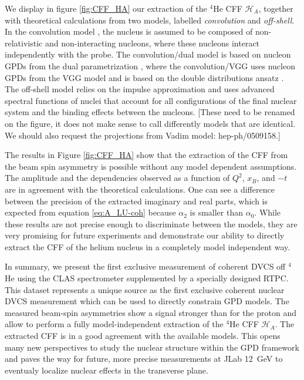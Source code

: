 \documentclass[preprint,nofootinbib,showpacs,prl,superscriptaddress,secnumarabic,amssymb,nobibnotes,aps,floatfix]{revtex4}
\begin{document}
We display in figure \ref{fig:CFF_HA} our extraction of the $^4$He CFF 
$\mathcal{H}_A$, together with theoretical calculations from two models, 
labelled {\em convolution} and {\em off-shell}. In the convolution 
model \cite{Vadim_priv}, the nucleus is assumed to be composed of 
non-relativistic and non-interacting nucleons, where these nucleons interact 
independently with the probe. The convolution/dual model is based on nucleon 
GPDs from the dual parametrization \cite{Guzey:2006xi}, where the 
convolution/VGG uses nucleon GPDs  from the VGG model and is based on the 
double distributions ansatz \cite{DD_model}. The off-shell model 
\cite{GonzalezHernandez:2012jv} relies on the impulse approximation and uses 
advanced spectral functions of  nuclei that account for all configurations of 
the final nuclear system and the binding effects between the nucleons.
[These need to be renamed on the figure, it does not make sense to call differently
models that are identical. We should also request the projections from Vadim
model: hep-ph/0509158.]

The results in Figure \ref{fig:CFF_HA} show that the extraction of the CFF
from the beam spin asymmetry is possible without any model dependent 
assumptions. The amplitude and the dependencies observed as a function of 
$Q^{2}$, $x_B$, and $-t$ are in agreement 
with the theoretical calculations. One can see a difference between the 
precision of the extracted imaginary and real parts, which is expected from
equation \ref{eq:A_LU-coh} because $\alpha_2$ is smaller than $\alpha_0$. 
While these results are not precise enough to discriminate between the models,
they are very promising for future experiments and demonstrate our ability
to directly extract the CFF of the helium nucleus in a completely model
independent way.


In summary, we present the first exclusive measurement of coherent DVCS 
off $^4$He using the CLAS spectrometer supplemented  
by a specially designed RTPC. This dataset represents a 
unique source as the first exclusive coherent nuclear DVCS measurement which 
can be used to directly constrain GPD models. The measured beam-spin asymmetries 
show a signal stronger than for the proton and allow to perform a fully 
model-independent extraction of the $^4$He CFF $\mathcal{H}_A$. The extracted 
CFF is in a good agreement with the available models. This opens 
many new perspectives to study the nuclear structure within the GPD framework 
and paves the way for future, more precise measurements at JLab 12~GeV to 
eventualy localize nuclear effects in the transverse plane.
\end{document}
